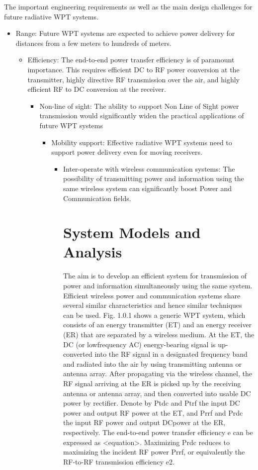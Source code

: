 \documentclass[hidelinks, 12pt]{report}
\begin{document}
The important engineering requirements as well as the main design challenges for future radiative WPT systems.
\begin{itemize}
\item{Range: Future WPT systems are expected to achieve power delivery for distances from a few meters to hundreds of meters.}
\begin{itemize}
\item{Efficiency: The end-to-end power transfer efficiency is of paramount importance. This requires efficient DC to RF power conversion at the transmitter, highly directive RF transmission over the air, and highly efficient RF to DC conversion at the receiver.}
\begin{itemize}
\item{Non-line of sight: The ability to support Non Line of Sight power transmission would significantly widen the practical applications of future WPT systems }
\begin{itemize}
\item{Mobility support: Effective radiative WPT systems need to support power delivery even for moving receivers.}
\begin{itemize}
\item{Inter-operate with wireless communication systems: The possibility of transmitting power and information using the same wireless system can significantly boost Power and Communication fields.}

\chapter{System Models and Analysis}
\justify
The aim is to develop an efficient system for transmission of power and information simultaneously using the same system. Efficient
wireless power and communication systems share several similar characteristics and hence similar techniques can be used. Fig. 1.0.1 shows a generic WPT system, which consists of an energy transmitter (ET) and an energy receiver (ER) that are separated by a wireless medium. At the ET, the DC (or lowfrequency AC) energy-bearing signal is up-converted into the RF signal in a designated frequency band and radiated into the air by using transmitting antenna or antenna array. After propagating via the wireless channel, the RF signal arriving at the ER is picked up by the receiving antenna or antenna array, and then converted into usable DC power by rectifier. Denote by Ptdc and Ptrf the input DC power and output RF power at the ET, and Prrf and Prdc the input RF power and output DCpower at the ER, respectively. The end-to-end power transfer efficiency e can be expressed as <equation>. Maximizing Prdc reduces to maximizing the incident RF power Prrf, or equivalently the RF-to-RF transmission efficiency e2.


\end{itemize}
\end{itemize}
\end{itemize}
\end{itemize}
\end{itemize}
\end{document}
